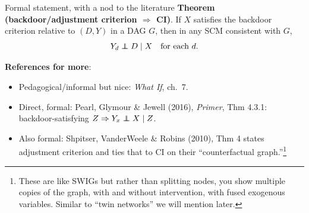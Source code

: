 \documentclass[xcolor=dvipsnames]{beamer}
\newcommand\E{\mathbb{E}}
\newcommand\indep{\protect\mathpalette{\protect\independenT}{\perp}}
\def\independenT#1#2{\mathrel{\rlap{$#1#2$}\mkern2mu{#1#2}}}
\begin{document}
\begin{frame}{Formal statement, with a nod to the literature}
\footnotesize
{} \textbf{Theorem (backdoor/adjustment criterion $\Rightarrow$ CI)}. If $X$ satisfies the backdoor criterion relative to $(D,Y)$ in a DAG $G$, then in any SCM consistent with $G$,
$$Y_d \indep D \mid X \quad \text{for each } d.$$

\medskip
{} \textbf{References for more}:
\begin{itemize}
\footnotesize
\item Pedagogical/informal but nice: \textit{What If}, ch.\ 7.
\item Direct, formal: Pearl, Glymour \& Jewell (2016), \textit{Primer}, Thm 4.3.1: backdoor-satisfying $Z \Rightarrow Y_x \indep X \mid Z$.
\item Also formal: Shpitser, VanderWeele \& Robins (2010), Thm 4 states adjustment criterion and ties that to CI on their ``counterfactual graph.''\footnote{These are like SWIGs but rather than splitting nodes, you show multiple copies of the graph, with and without intervention, with fused exogenous variables. Similar to ``twin networks'' we will mention later.}
\end{itemize}
\end{frame}




\end{document}
